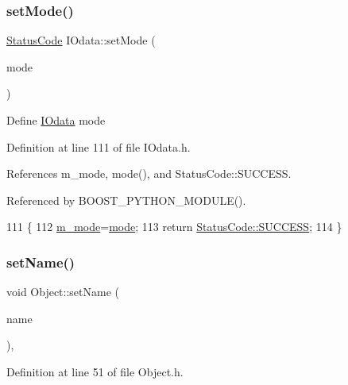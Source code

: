 \subsubsection{\texorpdfstring{set\+Mode()}{setMode()}}
{\footnotesize\ttfamily \hyperlink{classStatusCode}{Status\+Code} I\+Odata\+::set\+Mode (\begin{DoxyParamCaption}\item[{\hyperlink{classIOdata_a044e9a4a0c6d25a43ebfe29c4fa4f1e5}{I\+Odata\+::\+Mode}}]{mode }\end{DoxyParamCaption})\hspace{0.3cm}{\ttfamily [inline]}}

Define \hyperlink{classIOdata}{I\+Odata} mode 

Definition at line 111 of file I\+Odata.\+h.



References m\+\_\+mode, mode(), and Status\+Code\+::\+S\+U\+C\+C\+E\+SS.



Referenced by B\+O\+O\+S\+T\+\_\+\+P\+Y\+T\+H\+O\+N\+\_\+\+M\+O\+D\+U\+L\+E().


\begin{DoxyCode}
111                                      \{
112     \hyperlink{classIOdata_a0782e31763fa855f1ecbd377dce538e6}{m\_mode}=\hyperlink{classIOdata_aae2073c3bc6bc9f620dc0fca7fccc9a7}{mode};
113     \textcolor{keywordflow}{return} \hyperlink{classStatusCode_a6f565cbeadc76d14c72f047e5e85eb4badd0da38d3ba0d922efd1f4619bc37ad8}{StatusCode::SUCCESS};
114   \}
\end{DoxyCode}
\mbox{\label{classObject_ae30fea75683c2d149b6b6d17c09ecd0c}} 
\subsubsection{\texorpdfstring{set\+Name()}{setName()}}
{\footnotesize\ttfamily void Object\+::set\+Name (\begin{DoxyParamCaption}\item[{std\+::string}]{name }\end{DoxyParamCaption})\hspace{0.3cm}{\ttfamily [inline]}, {\ttfamily [inherited]}}



Definition at line 51 of file Object.\+h.



